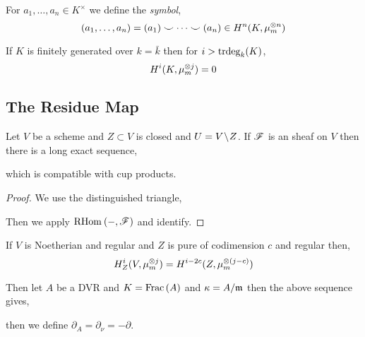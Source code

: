 \documentclass[12pt]{article}
\begin{document}
\begin{defn}
For $a_1, \dots, a_n \in K^\times$ we define the \textit{symbol},
\[ (a_1, \dots, a_n) = (a_1) \smile \cdots \smile (a_n) \in H^n(K, \mu_m^{\otimes n}) \]
\end{defn}

\begin{theorem}
If $K$ is finitely generated over $k = \bar{k}$ then for $i > \mathrm{trdeg}_{k}(K)$,
\[ H^i(K, \mu_m^{\otimes j}) = 0 \]
\end{theorem}

\subsection{The Residue Map}

\begin{thm}
Let $V$ be a scheme and $Z \subset V$ is closed and $U = V \! \setminus \! Z$. If $\mathscr{F}$ is an \etale sheaf on $V$ then there is a long exact sequence,
\begin{center}
\end{center}
which is compatible with cup products.
\end{thm}

\begin{proof}
We use the distinguished triangle,
\begin{center}
\end{center}
Then we apply $\mathrm{RHom}_{} \left( -, \mathscr{F} \right)$ and identify. 
\end{proof}

\begin{theorem}
If $V$ is Noetherian and regular and $Z$ is pure of codimension $c$ and regular then,
\[ H^i_Z(V, \mu_m^{\otimes j}) = H^{i-2c}(Z, \mu_m^{\otimes (j-c)}) \]
\end{theorem}

Then let $A$ be a DVR and $K = \mathrm{Frac}\left(A\right)$ and $\kappa = A / \mathfrak{m}$ then the above sequence gives,
\begin{center}
\end{center}
then we define $\partial_A = \partial_{\nu} = - \partial$.
\end{document}
